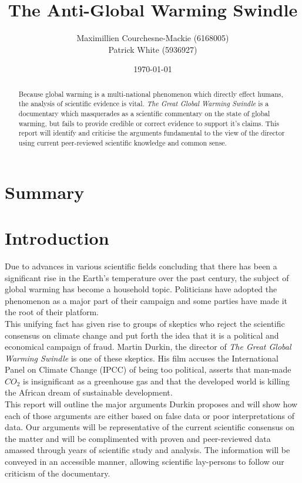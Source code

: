 \documentclass[12pt]{article}
\title{The Anti-Global Warming Swindle}
\author{Maximillien Courchesne-Mackie (6168005) \\
             Patrick White (5936927)}
\date{\today}
\begin{document}
\maketitle
\newpage

\begin{abstract}
    Because global warming is a multi-national phenomenon which directly effect humans, the analysis of scientific evidence is vital. \textit{The Great Global Warming Swindle} is a documentary which masquerades as a scientific commentary on the state of global warming, but fails to provide credible or correct evidence to support it's claims. This report will identify and criticise the arguments fundamental to the view of the director using current peer-reviewed scientific knowledge and common sense.
\end{abstract}
\newpage

\tableofcontents
\newpage

\listoffigures
\listoftables
\newpage

\section*{Summary}
\newpage

\section{Introduction}
	Due to advances in various scientific fields concluding that there has been a significant rise in the Earth's temperature over the past century, the subject of global warming has become a household topic. Politicians have adopted the phenomenon as a major part of their campaign and some parties have made it the root of their platform. \\
	
	This unifying fact has given rise to groups of skeptics who reject the scientific consensus on climate change and put forth the idea that it is a political and economical campaign of fraud. Martin Durkin, the director of \textit{The Great Global Warming Swindle} is one of these skeptics. His film accuses the International Panel on Climate Change (IPCC) of being too political, asserts that man-made $CO_2$ is insignificant as a greenhouse gas and that the developed world is killing the African dream of sustainable development. \\
	
	This report will outline the major arguments Durkin proposes and will show how each of those arguments are either based on false data or poor interpretations of data. Our arguments will be representative of the current scientific consensus on the matter and will be complimented with proven and peer-reviewed data amassed through years of scientific study and analysis. The information will be conveyed in an accessible manner, allowing scientific lay-persons to follow our criticism of the documentary. \\
\end{document}
